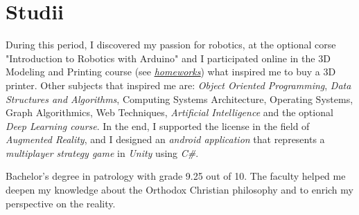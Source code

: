 %


\section{Studii}

{
\idea During this period, I discovered my passion for robotics, at the optional corse "Introduction to Robotics with Arduino" and I participated online in the 3D Modeling and Printing course
(see \href{https://github.com/24Arys11/3D-modeling/tree/main/Homeworks}{\uline{\emph{homeworks}}})
what inspired me to buy a 3D printer.
\idea Other subjects that inspired me are: \emph{Object Oriented Programming}, \emph{ Data Structures and Algorithms}, Computing Systems Architecture, Operating Systems, Graph Algorithmics, Web Techniques, \emph{Artificial Intelligence} and the optional \emph{Deep Learning course}.
\idea In the end, I supported the license in the field of \emph{Augmented Reality}, and I designed an \emph{android application} that represents a \emph{multiplayer strategy game} in \emph{Unity} using \emph{C\#}.
}

{
\idea Bachelor's degree in patrology with grade 9.25 out of 10.
\idea The faculty helped me deepen my knowledge about the Orthodox Christian philosophy and to enrich my perspective on the reality.
}